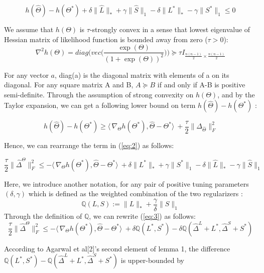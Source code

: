 \documentclass{article}
\begin{document}
\begin{equation}\label{eq:2}
    h(\hat{\Theta})-h(\Theta^{*}) 
    + \delta \|\hat{L}\|_\ast + \gamma \|\hat{S}\|_1 
    - \delta \|L^{*}\|_\ast - \gamma \|S^{*}\|_1 \leq 0
\end{equation}

We assume that $h(\Theta)$ is $\tau$-strongly convex in a sense that lowest eigenvalue of Hessian matrix of likelihood function is bounded away from zero ($\tau > 0$):  
\[
\nabla^{2}h(\Theta) = diag\Big(vec\Big(\frac{\exp(\Theta)}{(1+\exp(\Theta))^{2}}
\Big)\Big) \succcurlyeq \tau I_{\frac{n(n-1)}{2}\times \frac{n(n-1)}{2}}
\]

For any vector $a$, diag(a) is the diagonal matrix with elements of a on its diagonal. For any square matrix A and B, $ A \succcurlyeq B $ if and only if A-B is positive semi-definite. Through the assumption of strong convexity on $h(\Theta)$, and by the Taylor expansion, we can get a following lower bound on term $h(\hat{\Theta})-h(\Theta^{*})$ :

\[
h(\hat{\Theta})-h(\Theta^{*}) \geq 
\langle\, \nabla_{\Theta}h(\Theta^{*}),\hat{\Theta}-\Theta^{*}\rangle\
+ \frac{\tau}{2}\|\Delta_{\hat{\Theta}}\|_{F}^{2}
\]

Hence, we can rearrange the term in (\ref{eq:2}) as follows:

\begin{equation}\label{eq:3}
    \frac{\tau}{2}\|\hat{\Delta}^{\Theta}\|_{F}^{2} \leq 
    -\langle\,\nabla_{\Theta}h(\Theta^{*}),\hat{\Theta}-\Theta^{*}\rangle\
    + \delta \|L^{*}\|_\ast + \gamma \|S^{*}\|_1 
    - \delta \|\hat{L}\|_\ast - \gamma \|\hat{S}\|_1
\end{equation}

Here, we introduce another notation, for any pair of positive tuning parameters $(\delta,\gamma)$ which is defined as the weighted combination of the two regularizers : 
\[
\mathbb{Q}(L,S) := \|L\|_{*} + \frac{\gamma}{\delta}\|S\|_1
\]
Through the definition of $\mathbb{Q}$, we can rewrite (\ref{eq:3}) as follows:
\begin{equation}\label{eq:4}
    \frac{\tau}{2}\|\hat{\Delta}^{\Theta}\|_{F}^{2} \leq 
    -\langle\,\nabla_{\Theta}h(\Theta^{*}),\hat{\Theta}-\Theta^{*}\rangle\
    + \delta \mathbb{Q}(L^{*},S^{*}) - \delta \mathbb{Q}(\hat{\Delta}^L + L^{*},\hat{\Delta}^S + S^{*})
\end{equation}

According to Agarwal et al[2]'s second element of lemma 1, 
the difference $\mathbb{Q}(L^*,S^*)- \mathbb{Q}(\hat{\Delta}^L + L^{*},\hat{\Delta}^S + S^{*})$ is upper-bounded by 
\end{document}
